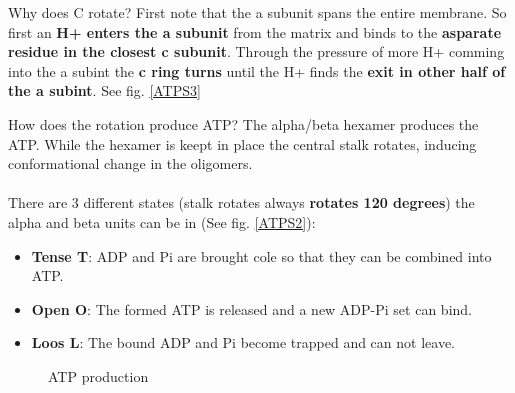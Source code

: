 \documentclass[../main.tex]{subfiles}
\begin{document}
\begin{RemarkWithTitel}{Why does C rotate?}
	First note that the a subunit spans the entire membrane. So first an \textbf{H+ enters the a subunit} from the matrix and binds to the \textbf{asparate residue in the closest c subunit}. Through the pressure of more H+ comming into the a subint the \textbf{c ring turns} until the H+ finds the \textbf{exit in other half of the a subint}. See fig. \ref{ATPS3}
\end{RemarkWithTitel}

\begin{RemarkWithTitel}{How does the rotation produce ATP?}
	The alpha/beta hexamer produces the ATP. While the hexamer is keept in place the central stalk rotates, inducing conformational change in the oligomers. \\
	\\
	There are 3 different states (stalk rotates always \textbf{rotates 120 degrees}) the alpha and beta units can be in (See fig. \ref{ATPS2}): 
	\begin{itemize}
		\item \textbf{Tense T}: ADP and Pi are brought cole so that they can be combined into ATP.
		
		\item \textbf{Open O}: The formed ATP is released and a new ADP-Pi set can bind.
		
		\item \textbf{Loos L}: The bound ADP and Pi become trapped and can not leave. 
	\end{itemize}
	
\end{RemarkWithTitel}


\begin{figure}[H]
	\centering
	\caption{ATP production}
\end{figure}
\end{document}

